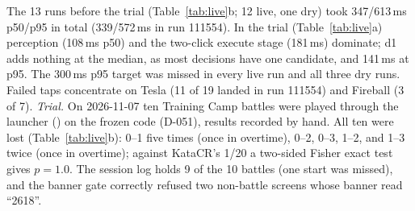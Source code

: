 The 13 runs before the trial (Table~\ref{tab:live}b; 12 live, one dry) took 347/613\,ms p50/p95 in total (339/572\,ms in run 111554). In the trial (Table~\ref{tab:live}a) perception (108\,ms p50) and the two-click execute stage (181\,ms) dominate; d1 adds nothing at the median, as most decisions have one candidate, and 141\,ms at p95. The 300\,ms p95 target was missed in every live run and all three dry runs. Failed taps concentrate on Tesla (11 of 19 landed in run 111554) and Fireball (3 of 7). %
\emph{Trial.} On 2026-11-07 ten Training Camp battles were played through the launcher () on the frozen code (D-051), results recorded by hand. All ten were lost (Table~\ref{tab:live}b): 0--1 five times (once in overtime), 0--2, 0--3, 1--2, and 1--3 twice (once in overtime); against KataCR's 1/20 a two-sided Fisher exact test gives $p=1.0$. The session log holds 9 of the 10 battles (one start was missed), and the banner gate correctly refused two non-battle screens whose banner read ``2618''. %

